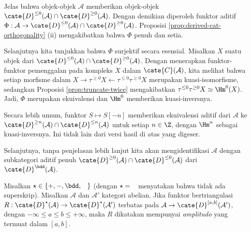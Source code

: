 \begin{bukti}
	Jelas bahwa objek-objek $\mathcal{A}$ memberikan objek-objek
	$\cate{D}^{\leq 0}(\mathcal{A}) \cap \cate{D}^{\geq 0}(\mathcal{A})$.
	Dengan demikian diperoleh funktor aditif
	$\Phi: \mathcal{A} \to \cate{D}^{\leq 0}(\mathcal{A}) \cap
	\cate{D}^{\geq 0}(\mathcal{A})$. Proposisi
	\ref{prop:derived-cat-orthogonality} (ii) mengakibatkan bahwa $\Phi$ penuh dan
	setia.

	Selanjutnya kita tunjukkan bahwa $\Phi$ surjektif secara esensial. Misalkan
	$X$ suatu objek dari
	$\cate{D}^{\leq 0}(\mathcal{A}) \cap \cate{D}^{\geq 0}(\mathcal{A})$.
	Dengan menerapkan funktor-funktor pemenggalan pada kompleks $X$ dalam
	$\cate{C}(\mathcal{A})$, kita melihat bahwa setiap morfisme dalam
	$X \to \tau^{\geq 0} X \leftarrow \tau^{\leq 0} \tau^{\geq 0} X$
	merupakan kuasi-isomorfisme, sedangkan Proposisi
	\ref{prop:truncate-twice} mengakibatkan
	$\tau^{\leq 0} \tau^{\geq 0} X \simeq \Hm^0(X)$. Jadi, $\Phi$ merupakan
	ekuivalensi dan $\Hm^0$ memberikan kuasi-inversnya.
\end{bukti}

Secara lebih umum, funktor $S \mapsto S[-n]$ memberikan ekuivalensi aditif
dari $\mathcal{A}$ ke
$\cate{D}^{\geq n}(\mathcal{A}) \cap \cate{D}^{\leq n}(\mathcal{A})$ untuk
setiap $n \in \Z$, dengan $\Hm^n$ sebagai kuasi-inversnya. Ini tidak lain dari
versi hasil di atas yang digeser.

Selanjutnya, tanpa penjelasan lebih lanjut kita akan mengidentifikasi
$\mathcal{A}$ dengan subkategori aditif penuh
$\cate{D}^{\geq 0}(\mathcal{A}) \cap \cate{D}^{\leq 0}(\mathcal{A})$ dari
$\cate{D}^{\bdd}(\mathcal{A})$.

\begin{definisi}\label{def:functor-amplitude}
	Misalkan $\star \in \{+, -, \bdd, \hspace{0.8em}\}$ (dengan
	$\star = \hspace{0.8em}$ menyatakan bahwa tidak ada superskrip). Misalkan
	$\mathcal{A}$ dan $\mathcal{A}'$ kategori abelian. Jika funktor
	bertriangulasi
	$R: \cate{D}^\star(\mathcal{A}) \to \cate{D}^\star(\mathcal{A}')$
	terbatas pada
	$\mathcal{A} \to \cate{D}^{[a,b]}(\mathcal{A}')$, dengan
	$-\infty \leq a \leq b \leq +\infty$, maka $R$ dikatakan mempunyai
	\emph{amplitudo} yang termuat dalam $[a,b]$.
\end{definisi}

